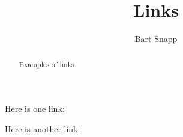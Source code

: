 \documentclass{ximera}
\title[Examples:]{Links}
\author{Bart Snapp}
\begin{document}
\begin{abstract}
  Examples of links.
\end{abstract}
\maketitle

Here is one link: 

Here is another link: 
\end{document}
